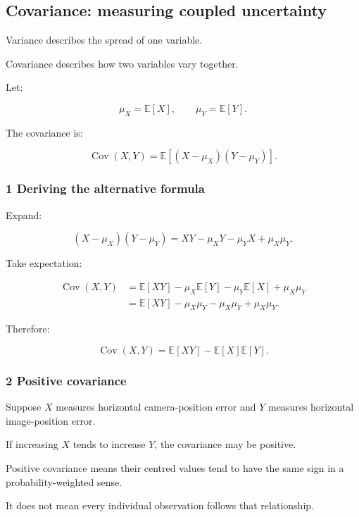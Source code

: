 \subsection{Covariance: measuring coupled uncertainty}\label{02-foundations-ii-ch023-covariance-measuring-coupled-uncertainty}

Variance describes the spread of one variable.

Covariance describes how two variables vary together.

Let:

\[
 \mu_X=\mathbb E[X], \qquad \mu_Y=\mathbb E[Y].
\]

The covariance is:

\[
 \boxed{ \operatorname{Cov}(X,Y)= \mathbb E[(X-\mu_X)(Y-\mu_Y)] }.
\]

\subsubsection{1 Deriving the alternative formula}\label{02-foundations-ii-ch023-deriving-the-alternative-formula}

Expand:

\[
 (X-\mu_X)(Y-\mu_Y) = XY-\mu_XY-\mu_YX+\mu_X\mu_Y.
\]

Take expectation:

\[
 \begin{aligned} \operatorname{Cov}(X,Y) &=\mathbb E[XY] -\mu_X\mathbb E[Y] -\mu_Y\mathbb E[X] +\mu_X\mu_Y\\ &=\mathbb E[XY] -\mu_X\mu_Y-\mu_X\mu_Y+\mu_X\mu_Y. \end{aligned}
\]

Therefore:

\[
 \boxed{ \operatorname{Cov}(X,Y) = \mathbb E[XY]-\mathbb E[X]\mathbb E[Y] }.
\]

\subsubsection{2 Positive covariance}\label{02-foundations-ii-ch023-positive-covariance}

Suppose \(X\) measures horizontal camera-position error and \(Y\) measures horizontal image-position error.

If increasing \(X\) tends to increase \(Y\), the covariance may be positive.

Positive covariance means their centred values tend to have the same sign in a probability-weighted sense.

It does not mean every individual observation follows that relationship.

